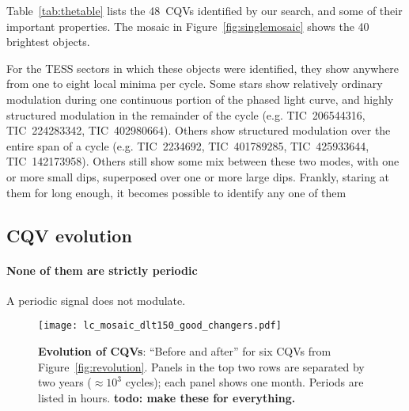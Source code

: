 \documentclass[11pt,twocolumn,tighten]{aastex63}
\newcommand{\ncpvsfound}{{48}}
\begin{document}
Table~\ref{tab:thetable} lists the \ncpvsfound\ CQVs identified by
our search, and some of their important properties.
The mosaic in Figure~\ref{fig:singlemosaic} shows the 40 brightest
objects.

For the TESS sectors in which these objects were identified, they show
anywhere from one to eight local minima per cycle.
Some stars show relatively ordinary modulation during one continuous
portion of the phased light curve, and highly structured modulation in
the remainder of the cycle (e.g. TIC~206544316, TIC~224283342,
TIC~402980664).
Others show structured modulation over the entire span of a cycle
(e.g. TIC~2234692, TIC~401789285, TIC~425933644, TIC~142173958).
Others still show some mix between these two modes,
with one or more small dips, superposed over one or more large dips.
Frankly, staring at them for long enough,
it becomes possible to identify any one of them



\subsection{CQV evolution}

\paragraph{None of them are strictly periodic}

A periodic signal does not modulate.



\begin{figure*}[!t]
	\begin{center}
			\centering
			\texttt{[image: lc\_mosaic\_dlt150\_good\_changers.pdf]}
		\vspace{-0.2cm}
		\caption{
		{\bf Evolution of CQVs}: ``Before and
      after'' for six CQVs from Figure~\ref{fig:revolution}.  Panels
      in the top two rows are separated by two years
      ($\approx$$10^3$ cycles); each panel shows one month.
      Periods are listed in hours. 
      {\bf todo: make these for everything.}
		}
		\label{fig:evoln}
	\end{center}
\end{figure*}
\end{document}
